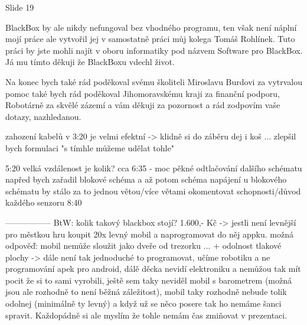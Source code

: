 



Slide 19

BlackBox by ale nikdy nefungoval bez vhodného programu, ten však není náplní mojí práce ale vytvořil jej v samostatně 
práci můj kolega Tomáš Rohlínek. Tuto práci by jste mohli najít v oboru informatiky pod názvem Software pro BlackBox.
Já mu tímto děkuji že BlackBoxu vdechl život.

Na konec bych také rád poděkoval svému školiteli Miroslavu Burdovi za vytrvalou pomoc %
také bych rád poděkoval Jihomoravskému kraji za finanční podporu, Robotárně za skvělé zázemí 
a vám děkuji za pozornost a rád zodpovím vaše dotazy, nazhledanou.



zahození kabelů v 3:20 je velmi efektní -> klidně si do záběru dej i koš ... 
zlepšil bych formulaci "s tímhle můžeme udělat tohle" %

5:20 velká vzdálenost je kolik? %
cca 6:35 - moc pěkné odtlačování dalšího schématu 
napřed bych zařadil blokové schéma a až potom schéma napájení 
u blokového schématu by stálo za to jednou větou/více větami okomentovat schopnosti/důvod každého senzoru 
8:40  

-----------------
BtW: kolik takový blackbox stojí? 1.600,- Kč -> jestli není levnější 
pro městkou hru koupit 20x levný mobil a naprogramovat do něj appku.    
možná odpověď: mobil nemůže sloužit jako dveře od trezorku ...  + odolnost tlakové plochy -> dále není tak jednoduché to programovat, učíme robotiku a ne programování apek pro android, dálě děcka nevidí elektroniku a nemůžou tak mít pocit že si to sami vyrobili, ještě sem taky neviděl mobil s barometrem (možná jsou ale rozhodně to není běžná záležitost), mobil taky rozhodně nebude tolik odolnej (minimálně ty levný) a když už se něco posere tak ho nemáme šanci spravit. Každopádně si ale myslím že tohle nemám čas zmiňovat v prezentaci.